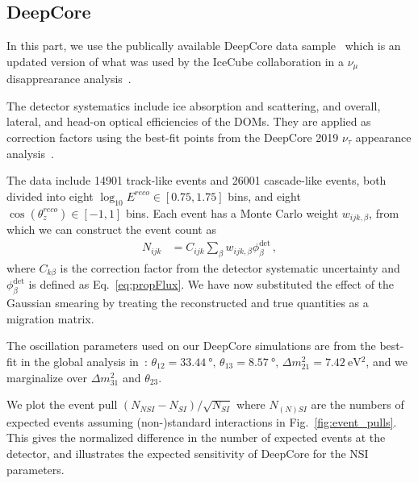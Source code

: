 \documentclass[draft=True]{revtex4-2}
\newcommand{\zreco}{\ensuremath{\cos{(\theta_z^{reco})}}}
\newcommand{\dm}{\Delta m^2_{31}}
\begin{document}
\subsection{DeepCore}\label{ch:DCmethod}
In this part, we use the publically available DeepCore data sample~\cite{DC2019data} which is an updated version of what was used by the 
IceCube collaboration in a $\nu_\mu$ disapprearance analysis~\cite{DC2018mudisappearance}.

The detector systematics include ice absorption and scattering, and overall, lateral, and head-on optical efficiencies of the DOMs. 
They are applied as correction factors using the best-fit points from the DeepCore 2019 $\nu_\tau$ appearance 
analysis~\cite{DC2019tauappearance}.

The data include 14901 track-like events and 26001 cascade-like events, both divided into eight 
$ \log_{10}E^{reco} \in [0.75,1.75]$ bins, and eight $\zreco \in [-1,1]$ bins. Each event has a Monte Carlo weight $w_{ijk,\beta}$,
from which we can construct the event count as
\begin{align}\label{eq:MCevents}
    N_{ijk} &= C_{ijk}\sum_{\beta}w_{ijk,\beta} \phi_\beta^\text{det}\,,
\end{align}
where $C_{k\beta}$ is the correction factor from the detector systematic uncertainty and $\phi_\beta^\text{det}$ is defined as Eq.~\ref{eq:propFlux}. We have now substituted the effect of the Gaussian smearing 
by treating the reconstructed and true quantities as a migration matrix. 

The oscillation parameters used on our DeepCore simulations are from the
best-fit in the global analysis in~\cite{nufit}: $\theta_{12} = \SI{33.44}{\degree},\, \theta_{13} = \SI{8.57}{\degree},\, \Delta m^2_{21} =  \SI{7.42}{\electronvolt^2}$, and we 
marginalize over $\dm$ and $\theta_{23}$.

We plot the event pull $(N_{NSI} - N_{SI})/\sqrt{N_{SI}}$ where $N_{(N)SI}$ are the numbers of expected events
assuming (non-)standard interactions in Fig.~\ref{fig:event_pulls}. This gives the normalized difference in the
number of expected events at the detector, and illustrates the expected sensitivity of DeepCore for the NSI parameters.
\end{document}
